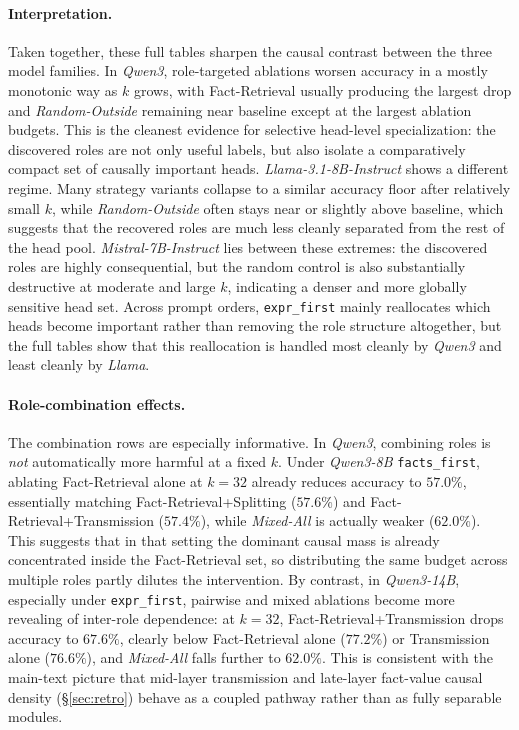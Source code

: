 \documentclass[11pt]{article}
\begin{document}
\paragraph{Interpretation.}
Taken together, these full tables sharpen the causal contrast between the three model families. In \textit{Qwen3}, role-targeted ablations worsen accuracy in a mostly monotonic way as $k$ grows, with Fact-Retrieval usually producing the largest drop and \textit{Random-Outside} remaining near baseline except at the largest ablation budgets. This is the cleanest evidence for selective head-level specialization: the discovered roles are not only useful labels, but also isolate a comparatively compact set of causally important heads. \textit{Llama-3.1-8B-Instruct} shows a different regime. Many strategy variants collapse to a similar accuracy floor after relatively small $k$, while \textit{Random-Outside} often stays near or slightly above baseline, which suggests that the recovered roles are much less cleanly separated from the rest of the head pool. \textit{Mistral-7B-Instruct} lies between these extremes: the discovered roles are highly consequential, but the random control is also substantially destructive at moderate and large $k$, indicating a denser and more globally sensitive head set. Across prompt orders, \texttt{expr\_first} mainly reallocates which heads become important rather than removing the role structure altogether, but the full tables show that this reallocation is handled most cleanly by \textit{Qwen3} and least cleanly by \textit{Llama}.

\paragraph{Role-combination effects.}
The combination rows are especially informative. In \textit{Qwen3}, combining roles is \emph{not} automatically more harmful at a fixed $k$. Under \textit{Qwen3-8B} \texttt{facts\_first}, ablating Fact-Retrieval alone at $k=32$ already reduces accuracy to $57.0\%$, essentially matching Fact-Retrieval+Splitting ($57.6\%$) and Fact-Retrieval+Transmission ($57.4\%$), while \textit{Mixed-All} is actually weaker ($62.0\%$). This suggests that in that setting the dominant causal mass is already concentrated inside the Fact-Retrieval set, so distributing the same budget across multiple roles partly dilutes the intervention. By contrast, in \textit{Qwen3-14B}, especially under \texttt{expr\_first}, pairwise and mixed ablations become more revealing of inter-role dependence: at $k=32$, Fact-Retrieval+Transmission drops accuracy to $67.6\%$, clearly below Fact-Retrieval alone ($77.2\%$) or Transmission alone ($76.6\%$), and \textit{Mixed-All} falls further to $62.0\%$. This is consistent with the main-text picture that mid-layer transmission and late-layer fact-value causal density (§\ref{sec:retro}) behave as a coupled pathway rather than as fully separable modules.
\end{document}
